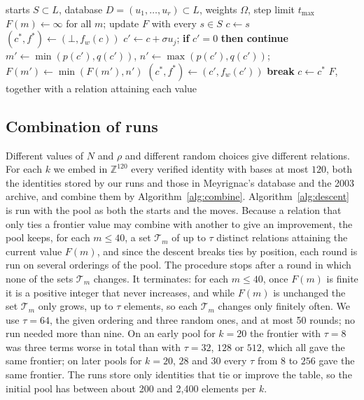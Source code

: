 \documentclass[11pt]{amsart}
\theoremstyle{definition}
\theoremstyle{remark}
\newcommand{\Z}{\mathbb{Z}}
\begin{document}
\begin{algorithm}[ht]
\caption{Descent with the sieve database as move set}\label{alg:descent}
\begin{algorithmic}[1]
\Require starts $S\subset L$, database $D=(u_1,\dots,u_r)\subset L$, weights $\Omega$, step limit $t_{\max}$
\State $F(m)\gets\infty$ for all $m$; update $F$ with every $s\in S$
  \State $c\gets s$
    \State $(c^\ast,f^\ast)\gets(\bot,f_w(c))$ 
      \State $c'\gets c+\sigma u_j$; \textbf{if} $c'=0$ \textbf{then continue}
      \State $m'\gets\min(p(c'),q(c'))$, $n'\gets\max(p(c'),q(c'))$; $F(m')\gets\min(F(m'),n')$
       $(c^\ast,f^\ast)\gets(c',f_w(c'))$ \EndIf
    \EndFor
     \textbf{break} \EndIf
    \State $c\gets c^\ast$
  \EndFor
\EndFor
\State \Return $F$, together with a relation attaining each value
\end{algorithmic}
\end{algorithm}

\subsection{Combination of runs}\label{sec:combine}
Different values of $N$ and $\rho$ and different random choices give different relations. For
each $k$ we embed in $\Z^{120}$ every verified identity with bases at most $120$, both the
identities stored by our runs and those in Meyrignac's database and the 2003 archive, and
combine them by Algorithm~\ref{alg:combine}. Algorithm~\ref{alg:descent} is run with the pool
as both the starts and the moves. Because a relation that only ties a frontier value may
combine with another to give an improvement, the pool keeps, for each $m\le40$, a set
$\mathcal T_m$ of up to $\tau$ distinct relations attaining the current value $F(m)$, and since
the descent breaks ties by position, each round is run on several orderings of the pool. The
procedure stops after a round in which none of the sets $\mathcal T_m$ changes. It terminates:
for each $m\le40$, once $F(m)$ is finite it is a positive integer that never increases, and
while $F(m)$ is unchanged the set $\mathcal T_m$ only grows, up to $\tau$ elements, so each
$\mathcal T_m$ changes only finitely often. We use $\tau=64$, the given ordering and three
random ones, and at most 50 rounds; no run needed more than nine. On an early pool for $k=20$
the frontier with $\tau=8$ was three terms worse in total than with $\tau=32$, $128$ or $512$,
which all gave the same frontier; on later pools for $k=20$, $28$ and $30$ every $\tau$ from $8$
to $256$ gave the same frontier. The runs store only identities
that tie or improve the table, so the initial pool has between about 200 and 2{,}400 elements per
$k$.
\end{document}
